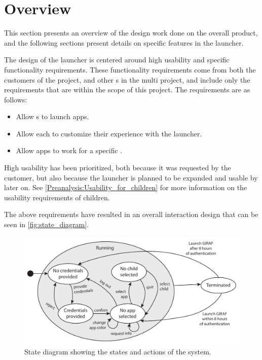 \chapter{Overview}
\label{sec:design_overview}
This section presents an overview of the design work done on the overall product, and the following sections present details on specific features in the launcher. \newline

The design of the \giraf[] launcher is centered around high usability and specific functionality requirements. 
These functionality requirements come from both the customers of the project, and other \localgroup[]s in the multi project, and include only the requirements that are within the scope of this project. \newline
The requirements are as follows:
\begin{itemize}
\item Allow \guardian[]s to launch apps.
\item Allow each \guardian[] to customize their experience with the launcher. 
\item Allow apps to work for a specific \autist[].
\end{itemize}

High usability has been prioritized, both because it was requested by the customer, but also because the launcher is planned to be expanded and usable by \autists[] later on.
See \autoref{Preanalysis:Usability_for_children} for more information on the usability requirements of children. \newline

The above requirements have resulted in an overall interaction design that can be seen in \autoref{fig:state_diagram}.

\begin{figure}[h]
	\centering
	\includegraphics[width=1\textwidth]{gfx/statediagram.pdf}
	\caption{State diagram showing the states and actions of the system.}
	\label{fig:state_diagram}
\end{figure}